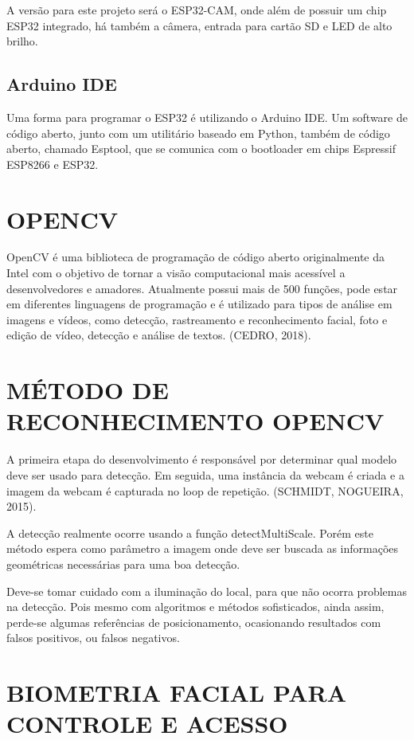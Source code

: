 A versão para este projeto será o ESP32-CAM, onde além de possuir um chip ESP32 
integrado, há também a câmera, entrada para cartão SD e LED de alto brilho.

\subsection{Arduino IDE}\label{sec:espacamento}

Uma forma para programar o ESP32 é utilizando o Arduino IDE.
Um software de código aberto, junto com um utilitário baseado em Python, também de código
aberto, chamado Esptool, que se comunica com o bootloader em chips Espressif ESP8266 e
ESP32.

\section{OPENCV}\label{sec:formatacaoTexto}

OpenCV é uma biblioteca de programação de código aberto originalmente da Intel com 
o objetivo de tornar a visão computacional mais acessível a desenvolvedores e amadores. 
Atualmente possui mais de 500 funções, pode estar em diferentes linguagens de programação e é 
utilizado para tipos de análise em imagens e vídeos, como detecção, rastreamento e 
reconhecimento facial, foto e edição de vídeo, detecção e análise de textos. (CEDRO, 2018).

\section{MÉTODO DE RECONHECIMENTO OPENCV}\label{sec:formatacaoTexto}

A primeira etapa do desenvolvimento é responsável por determinar qual modelo deve 
ser usado para detecção. Em seguida, uma instância da webcam é criada e a imagem da 
webcam é capturada no loop de repetição. (SCHMIDT, NOGUEIRA, 2015).

A detecção realmente ocorre usando a função detectMultiScale. Porém este método 
espera como parâmetro a imagem onde deve ser buscada as informações geométricas 
necessárias para uma boa detecção.

Deve-se tomar cuidado com a iluminação do local, para que não ocorra problemas na 
detecção. Pois mesmo com algoritmos e métodos sofisticados, ainda assim, perde-se algumas 
referências de posicionamento, ocasionando resultados com falsos positivos, ou falsos 
negativos.

\section{BIOMETRIA FACIAL PARA CONTROLE E ACESSO}\label{sec:formatacaoTexto}

